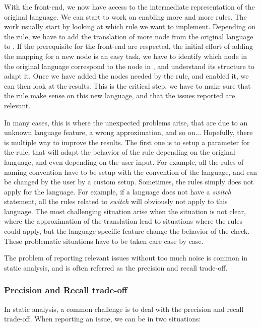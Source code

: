 With the front-end, we now have access to the intermediate representation of the original language. 
We can start to work on enabling more and more rules. 
The work usually start by looking at which rule we want to implement. 
Depending on the rule, we have to add the translation of more node from the original language to \slang{}. 
If the prerequisite for the front-end are respected, the initial effort of adding the mapping for a new node is an easy task, we have to identify which node in the original language correspond to the node in \slang{}, and understand its structure to adapt it. 
Once we have added the nodes needed by the rule, and enabled it, we can then look at the results. 
This is the critical step, we have to make sure that the rule make sense on this new language, and that the issues reported are relevant. 

In many cases, this is where the unexpected problems arise, that are due to an unknown language feature, a wrong approximation, and so on...
Hopefully, there is multiple way to improve the results. 
The first one is to setup a parameter for the rule, that will adapt the behavior of the rule depending on the original language, and even depending on the user input.
For example, all the rules of naming convention have to be setup with the convention of the language, and can be changed by the user by a custom setup. 
Sometimes, the rules simply does not apply for the language. 
For example, if a language does not have a \emph{switch} statement, all the rules related to \emph{switch} will obviously not apply to this language.
The most challenging situation arise when the situation is not clear, where the approximation of the translation lead to situations where the rules could apply, but the language specific feature change the behavior of the check. 
These problematic situations have to be taken care case by case.

The problem of reporting relevant issues without too much noise is common in static analysis, and is often referred as the precision and recall trade-off.

\subsubsection{Precision and Recall trade-off}
\label{subsubsec:precision_recall}

In static analysis, a common challenge is to deal with the precision and recall trade-off. When reporting an issue, we can be in two situations:

